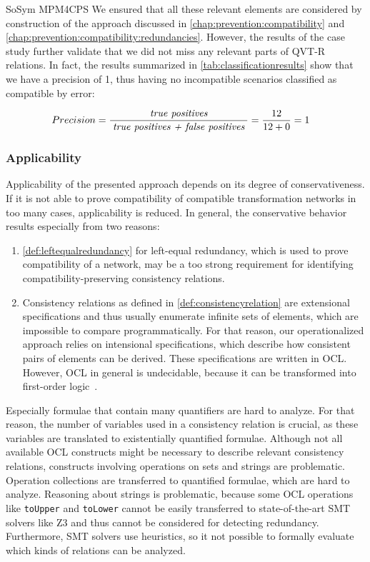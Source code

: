 \begin{copiedFrom}{SoSym MPM4CPS}
We ensured that all these relevant elements are considered by construction of the approach discussed in \autoref{chap:prevention:compatibility} and \autoref{chap:prevention:compatibility:redundancies}.
However, the results of the case study further validate that we did not miss any relevant parts of QVT-R relations.
In fact, the results summarized in \autoref{tab:classificationresults} show that we have a precision of 1, thus having no incompatible scenarios classified as compatible by error:

\begin{align*}
    &
    Precision = \frac{\; \textit{true positives} \;}{\; \textit{true positives + false positives} \;} = \frac{12}{12+0} = 1
\end{align*}


\subsubsection{Applicability}

Applicability of the presented approach depends on its degree of conservativeness.
If it is not able to prove compatibility of compatible transformation networks in too many cases, applicability is reduced.
In general, the conservative behavior results especially from two reasons:
\begin{enumerate}
    \item \autoref{def:leftequalredundancy} for left-equal redundancy, which is used to prove compatibility of a network, may be a too strong requirement for identifying compatibility-preserving consistency relations.
    \item Consistency relations as defined in \autoref{def:consistencyrelation} are extensional specifications and thus usually enumerate infinite sets of elements, which are impossible to compare programmatically.
    For that reason, our operationalized approach relies on intensional specifications, which describe how consistent pairs of elements can be derived.
    These specifications are written in OCL. 
    However, OCL in general is undecidable, because it can be transformed into first-order logic~\cite{beckert2002ocltranslation}.
\end{enumerate}
Especially formulae that contain many quantifiers are hard to analyze.
For that reason, the number of variables used in a consistency relation is crucial, as these variables are translated to existentially quantified formulae.
Although not all available OCL constructs might be necessary to describe relevant consistency relations, constructs involving operations on sets and strings are problematic.
Operation collections are transferred to quantified formulae, which are hard to analyze.
Reasoning about strings is problematic, because some OCL operations like \texttt{toUpper} and \texttt{toLower} cannot be easily transferred to state-of-the-art SMT solvers like Z3 and thus cannot be considered for detecting redundancy.
Furthermore, SMT solvers use heuristics, so it not possible to formally evaluate which kinds of relations can be analyzed.


\end{copiedFrom}
